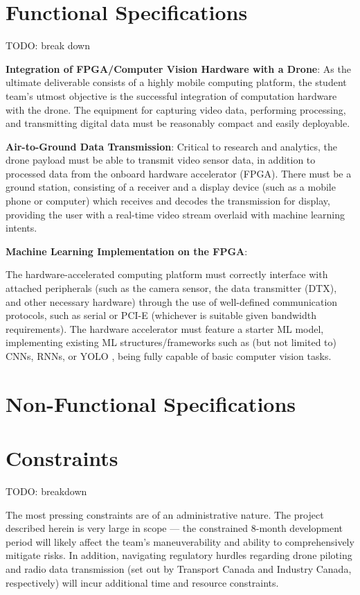 \documentclass[10pt,letterpaper]{article}
\begin{document}
\section{Functional Specifications}\label{section:func-spec}

TODO: break down

\textbf{Integration of FPGA/Computer Vision Hardware with a Drone}:
As the ultimate deliverable consists of a highly mobile computing platform,
the student team's utmost objective is the successful integration of computation hardware with the drone.
The equipment for capturing video data, performing processing, and transmitting digital data must be reasonably compact and easily deployable.

\textbf{Air-to-Ground Data Transmission}:
Critical to research and analytics, the drone payload must be able to transmit video sensor data, in addition to processed data
from the onboard hardware accelerator (FPGA). There must be a ground station, consisting of a receiver and a display device (such as a mobile phone or 
computer) which receives and decodes the transmission for display, providing the user with a real-time video stream overlaid with machine learning intents.


\textbf{Machine Learning Implementation on the FPGA}:

The hardware-accelerated computing platform must correctly interface with attached peripherals (such as the camera sensor, the data transmitter (DTX), and other necessary hardware) through the use of well-defined communication protocols, such as serial or PCI-E (whichever is suitable given bandwidth requirements). The hardware accelerator must feature a starter ML model, implementing existing ML structures/frameworks such as (but not limited to) CNNs, RNNs, or YOLO \cite{yolo}, being fully capable of basic computer vision tasks.

\section{Non-Functional Specifications}\label{section:non-func-spec}

\section{Constraints}\label{section:const}
TODO: breakdown

The most pressing constraints are of an administrative nature. The project described
herein is very large in scope --- the constrained 8-month development period 
will likely affect the team's maneuverability and ability to comprehensively mitigate risks. 
In addition, navigating regulatory hurdles regarding drone piloting and radio data transmission (set out by 
Transport Canada and Industry Canada, respectively) will incur additional time and resource constraints.
\end{document}
